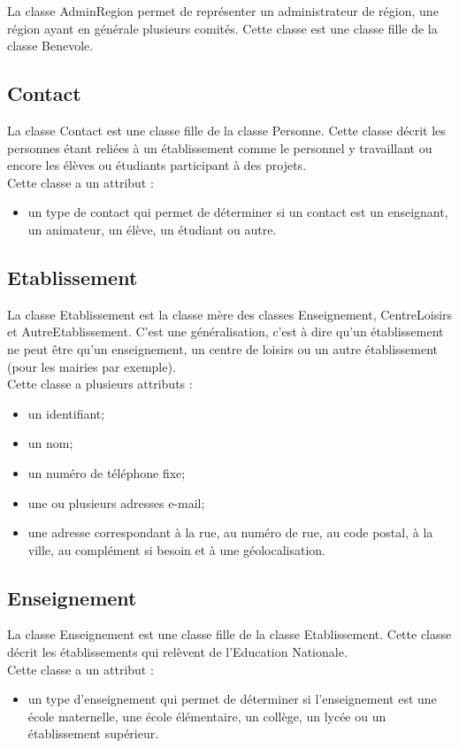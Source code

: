 \documentclass[asi, sansVersion]{picInsa}
\begin{document}
La classe AdminRegion permet de représenter un administrateur de région, une région ayant en générale plusieurs comités. Cette classe est une classe fille de la classe Benevole. 

\subsection*{Contact}

La classe Contact est une classe fille de la classe Personne. Cette classe décrit les personnes étant reliées à un établissement comme le personnel y travaillant ou encore les élèves ou étudiants participant à des projets. \\
Cette classe a un attribut : 
\begin{itemize}
\item un type de contact qui permet de déterminer si un contact est un enseignant, un animateur, un élève, un étudiant ou autre.
\end{itemize} 

\subsection*{Etablissement}

La classe Etablissement est la classe mère des classes Enseignement, CentreLoisirs et AutreEtablissement. C'est une généralisation, c'est à dire qu'un établissement ne peut être qu'un enseignement, un centre de loisirs ou un autre établissement (pour les mairies par exemple).\\
Cette classe a plusieurs attributs : 
\begin{itemize}
\item un identifiant;
\item un nom;
\item un numéro de téléphone fixe;
\item une ou plusieurs adresses e-mail;
\item une adresse correspondant à la rue, au numéro de rue, au code postal, à la ville, au complément si besoin et à une géolocalisation.
\end{itemize}

\subsection*{Enseignement}
La classe Enseignement est une classe fille de la classe Etablissement. Cette classe décrit les établissements qui relèvent de l'Education Nationale. \\
Cette classe a un attribut : 
\begin{itemize}
\item un type d'enseignement qui permet de déterminer si l'enseignement est une école maternelle, une école élémentaire, un collège, un lycée ou un établissement supérieur. 
\end{itemize} 
\end{document}
